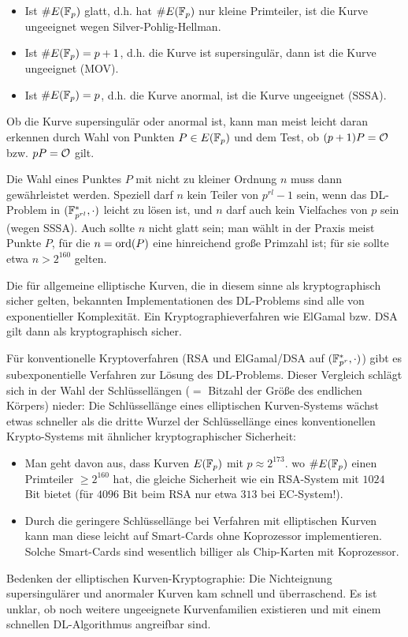 \begin{bem}
	\begin{itemize}
		\item Ist $\#E(\mathbb{F}_p)$ glatt, d.h. hat $\#E(\mathbb{F}_p)$ nur kleine Primteiler, ist die Kurve ungeeignet wegen Silver-Pohlig-Hellman.
		\item Ist $\#E(\mathbb{F}_p) = p+1$, d.h. die Kurve ist supersingulär, dann ist die Kurve ungeeignet (MOV).
		\item Ist $\#E(\mathbb{F}_p) = p$, d.h. die Kurve anormal, ist die Kurve ungeeignet (SSSA).
	\end{itemize}
	Ob die Kurve supersingulär oder anormal ist, kann man meist leicht daran erkennen durch Wahl von Punkten $P \in E(\mathbb{F}_p)$ und dem Test, ob $(p+1)P = \mathcal{O}$ bzw. $pP = \mathcal{O}$ gilt.
\end{bem}

\begin{bem}
	Die Wahl eines Punktes $P$ mit nicht zu kleiner Ordnung $n$ muss dann gewährleistet werden.
	Speziell darf $n$ kein Teiler von $p^{rl} - 1$ sein, wenn das DL-Problem in $(\mathbb{F}_{p^{rl}}^*,\cdot)$ leicht zu lösen ist, und $n$ darf auch kein Vielfaches von $p$ sein (wegen SSSA).
	Auch sollte $n$ nicht glatt sein; man wählt in der Praxis meist Punkte $P$, für die $n = \operatorname{ord}(P)$ eine hinreichend große Primzahl ist; für sie sollte etwa $n > 2^{160}$ gelten.
\end{bem}

\begin{bem}
	Die für allgemeine elliptische Kurven, die in diesem sinne als kryptographisch sicher gelten, bekannten Implementationen des DL-Problems sind alle von exponentieller Komplexität.
	Ein Kryptographieverfahren wie ElGamal bzw. DSA gilt dann als kryptographisch sicher.
\end{bem}

\begin{bem}
	Für konventionelle Kryptoverfahren (RSA und ElGamal/DSA auf $(\mathbb{F}_{p^r}^*,\cdot)$) gibt es subexponentielle Verfahren zur Lösung des DL-Problems. Dieser Vergleich schlägt sich in der Wahl der Schlüssellängen ($=$ Bitzahl der Größe des endlichen Körpers) nieder:
	Die Schlüssellänge eines elliptischen Kurven-Systems wächst etwas schneller als die dritte Wurzel der Schlüssellänge eines konventionellen Krypto-Systems mit ähnlicher kryptographischer Sicherheit: 
\end{bem}

\begin{bem}
	\begin{itemize}
		\item Man geht davon aus, dass Kurven $E(\mathbb{F}_p)$ mit $p \approx 2^{173}$. wo $\#E(\mathbb{F}_p)$ einen Primteiler $\geq 2^{160}$ hat, die gleiche Sicherheit wie ein RSA-System mit $1024$ Bit bietet (für $4096$ Bit beim RSA nur etwa $313$ bei EC-System!).
		\item Durch die geringere Schlüssellänge bei Verfahren mit elliptischen Kurven kann man diese leicht auf Smart-Cards ohne Koprozessor implementieren.
		Solche Smart-Cards sind wesentlich billiger als Chip-Karten mit Koprozessor.
	\end{itemize}
\end{bem}

\begin{bem}
	Bedenken der elliptischen Kurven-Kryptographie:
	Die Nichteignung supersingulärer und anormaler Kurven kam schnell und überraschend.
	Es ist unklar, ob noch weitere ungeeignete Kurvenfamilien existieren und mit einem schnellen DL-Algorithmus angreifbar sind.
\end{bem}